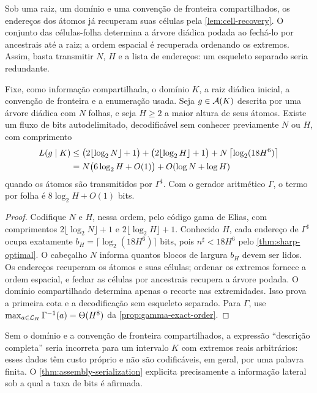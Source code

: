 Sob uma raiz, um domínio e uma convenção de fronteira compartilhados, os
endereços dos átomos já recuperam suas células pela
\cref{lem:cell-recovery}. O conjunto das células-folha determina a árvore
diádica podada ao fechá-lo por ancestrais até a raiz; a ordem espacial é
recuperada ordenando os extremos. Assim, basta transmitir $N$, $H$ e a lista
de endereços: um esqueleto separado seria redundante.

\begin{theorem}\label{thm:assembly-serialization}
Fixe, como informação compartilhada, o domínio $K$, a raiz diádica inicial,
a convenção de fronteira e a enumeração usada. Seja $g\in\mathcal{A}(K)$ descrita
por uma árvore diádica com $N$ folhas, e seja $H\ge2$ a maior altura de seus
átomos. Existe um fluxo de bits autodelimitado, decodificável sem conhecer
previamente $N$ ou $H$, com comprimento
\begin{align}
 L(g\mid K)
 &\le \bigl(2\lfloor\log_2N\rfloor+1\bigr)
      +\bigl(2\lfloor\log_2H\rfloor+1\bigr)
      +N\left\lceil\log_2(18H^6)\right\rceil \notag\\
 &=N\bigl(6\log_2H+O(1)\bigr)+O(\log N+\log H)
 \label{eq:assembly-bitrate}
\end{align}
quando os átomos são transmitidos por $\Gamma^\sharp$. Com o gerador
aritmético $\Gamma$, o termo por folha é $8\log_2H+O(1)$ bits.
\end{theorem}

\begin{proof}
Codifique $N$ e $H$, nessa ordem, pelo código gama de Elias, com comprimentos
$2\lfloor\log_2N\rfloor+1$ e
$2\lfloor\log_2H\rfloor+1$. Conhecido $H$, cada endereço de $\Gamma^\sharp$
ocupa exatamente
$b_H=\lceil\log_2(18H^6)\rceil$ bits, pois
$n^\sharp<18H^6$ pelo \cref{thm:sharp-optimal}. O cabeçalho $N$ informa
quantos blocos de largura $b_H$ devem ser lidos. Os endereços recuperam os
átomos e suas células; ordenar os extremos fornece a ordem espacial, e fechar
as células por ancestrais recupera a árvore podada. O domínio compartilhado
determina apenas o recorte nas extremidades. Isso prova a primeira cota e a
decodificação sem esqueleto separado. Para $\Gamma$, use
$\max_{a\in\mathcal{L}_H}\Gamma^{-1}(a)=\Theta(H^8)$ da
\cref{prop:gamma-exact-order}.
\end{proof}

\begin{remark}
Sem o domínio e a convenção de fronteira compartilhados, a expressão
``descrição completa'' seria incorreta para um intervalo $K$ com extremos
reais arbitrários: esses dados têm custo próprio e não são codificáveis, em
geral, por uma palavra finita. O \cref{thm:assembly-serialization} explicita
precisamente a informação lateral sob a qual a taxa de bits é afirmada.
\end{remark}

